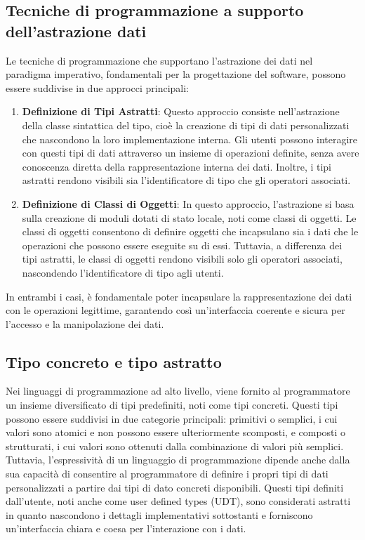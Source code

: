 \documentclass{article}
\begin{document}
	\subsection{Tecniche di programmazione a supporto dell'astrazione dati}
	Le tecniche di programmazione che supportano l'astrazione dei dati nel paradigma imperativo, fondamentali per la progettazione del software, possono essere suddivise in due approcci principali:
	\begin{enumerate}
		\item \textbf{Definizione di Tipi Astratti}: Questo approccio consiste nell'astrazione della classe sintattica del tipo, cioè la creazione di tipi di dati personalizzati che nascondono la loro implementazione interna. Gli utenti possono interagire con questi tipi di dati attraverso un insieme di operazioni definite, senza avere conoscenza diretta della rappresentazione interna dei dati. Inoltre, i tipi astratti rendono visibili sia l'identificatore di tipo che gli operatori associati.
		\item \textbf{Definizione di Classi di Oggetti}: In questo approccio, l'astrazione si basa sulla creazione di moduli dotati di stato locale, noti come classi di oggetti. Le classi di oggetti consentono di definire oggetti che incapsulano sia i dati che le operazioni che possono essere eseguite su di essi. Tuttavia, a differenza dei tipi astratti, le classi di oggetti rendono visibili solo gli operatori associati, nascondendo l'identificatore di tipo agli utenti.
	\end{enumerate}
	In entrambi i casi, è fondamentale poter incapsulare la rappresentazione dei dati con le operazioni legittime, garantendo così un'interfaccia coerente e sicura per l'accesso e la manipolazione dei dati.
	
	\subsection{Tipo concreto e tipo astratto}
	Nei linguaggi di programmazione ad alto livello, viene fornito al programmatore un insieme diversificato di tipi predefiniti, noti come tipi concreti. Questi tipi possono essere suddivisi in due categorie principali: primitivi o semplici, i cui valori sono atomici e non possono essere ulteriormente scomposti, e composti o strutturati, i cui valori sono ottenuti dalla combinazione di valori più semplici.
	\vspace{\baselineskip} \\
	Tuttavia, l'espressività di un linguaggio di programmazione dipende anche dalla sua capacità di consentire al programmatore di definire i propri tipi di dati personalizzati a partire dai tipi di dato concreti disponibili. Questi tipi definiti dall'utente, noti anche come user defined types (UDT), sono considerati astratti in quanto nascondono i dettagli implementativi sottostanti e forniscono un'interfaccia chiara e coesa per l'interazione con i dati.
\end{document}
